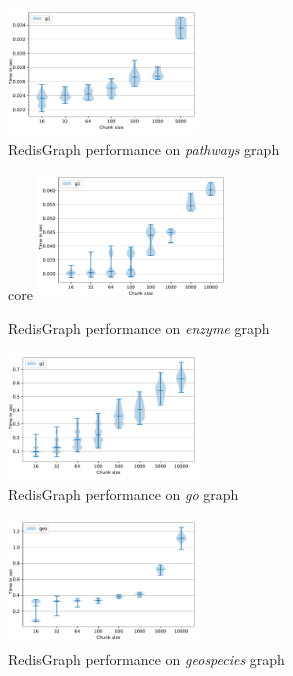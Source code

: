 \begin{figure}[h]
\centering
\includegraphics[width=0.45\textwidth]{data/raw_redis/pathways.pdf}
\caption{RedisGraph performance on \textit{pathways} graph}
\label{fig:redis_pathways_all}
\end{figure}

\begin{figure}[h]core
\centering
\includegraphics[width=0.45\textwidth]{data/raw_redis/enzyme.pdf}
\caption{RedisGraph performance on \textit{enzyme} graph}
\label{fig:redis_enzyme_all}
\end{figure}


\begin{figure}[h]
\centering
\includegraphics[width=0.45\textwidth]{data/raw_redis/go.pdf}
\caption{RedisGraph performance on \textit{go} graph}
\label{fig:redis_go_all}
\end{figure}

\begin{figure}[h]
\centering
\includegraphics[width=0.45\textwidth]{data/raw_redis/geospecies.pdf}
\caption{RedisGraph performance on \textit{geospecies} graph}
\label{fig:redis_geospecies_all}
\end{figure}

